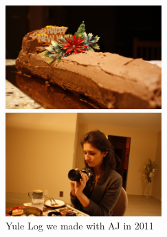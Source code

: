 \begin{figure}
  \includegraphics[width=60mm]{dermardiros/images/Logcake.JPG}
    \caption{Yule Log we made with AJ in 2011}
  \includegraphics[width=60mm]{dermardiros/images/Logcake 3.JPG}    
\end{figure}